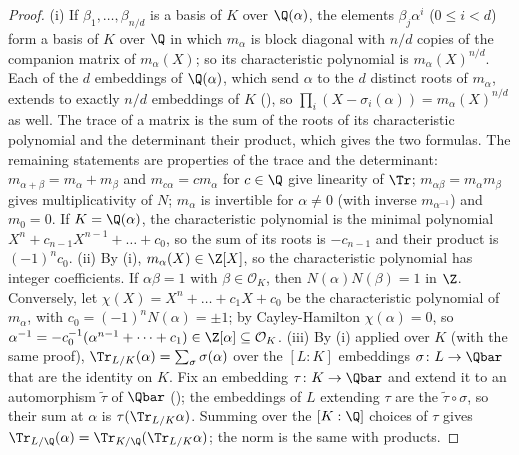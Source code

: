 \begin{proof}
(i) If $\beta_1,\dots,\beta_{n/d}$ is a basis of $K$ over $\Q(\alpha)$, the elements $\beta_j\alpha^i$ ($0\le i<d$) form a basis of $K$ over $\Q$ in which
$m_\alpha$ is block diagonal with $n/d$ copies of the companion matrix of $m_\alpha(X)$; so its characteristic polynomial is $m_\alpha(X)^{n/d}$.
Each of the $d$ embeddings of $\Q(\alpha)$, which send $\alpha$ to the $d$ distinct roots of $m_\alpha$, extends to exactly $n/d$ embeddings of
$K$ (), so $\prod_i(X-\sigma_i(\alpha))=m_\alpha(X)^{n/d}$ as well. The trace of a matrix is the sum of the roots of its
characteristic polynomial and the determinant their product, which gives the two formulas. The remaining statements are properties of the trace and
the determinant: $m_{\alpha+\beta}=m_\alpha+m_\beta$ and $m_{c\alpha}=cm_\alpha$ for $c\in\Q$ give linearity of $\Tr$; $m_{\alpha\beta}=m_\alpha m_\beta$ gives
multiplicativity of $N$; $m_\alpha$ is invertible for $\alpha\ne0$ (with inverse $m_{\alpha^{-1}}$) and $m_0=0$. If $K=\Q(\alpha)$, the characteristic polynomial is the
minimal polynomial $X^n+c_{n-1}X^{n-1}+\dots+c_0$, so the sum of its roots is $-c_{n-1}$ and their product is $(-1)^nc_0$.
(ii) By (i), $m_\alpha(X)\in\Z[X]$, so the characteristic polynomial has integer coefficients. If $\alpha\beta=1$ with
$\beta\in\mathcal O_K$, then $N(\alpha)N(\beta)=1$ in $\Z$. Conversely, let $\chi(X)=X^n+\dots+c_1X+c_0$ be the characteristic polynomial of
$m_\alpha$, with $c_0=(-1)^nN(\alpha)=\pm1$; by Cayley-Hamilton $\chi(\alpha)=0$, so $\alpha^{-1}=-c_0^{-1}(\alpha^{n-1}+\dots+c_1)\in\Z[\alpha]\subseteq\mathcal O_K$.
(iii) By (i) applied over $K$ (with the same proof), $\Tr_{L/K}(\alpha)=\sum_\sigma\sigma(\alpha)$ over the $[L:K]$ embeddings $\sigma\colon L\to\Qbar$
that are the identity on $K$. Fix an embedding $\tau\colon K\to\Qbar$ and extend it to an automorphism $\tilde\tau$ of $\Qbar$ (); the
embeddings of $L$ extending $\tau$ are the $\tilde\tau\circ\sigma$, so their sum at $\alpha$ is $\tau(\Tr_{L/K}\alpha)$. Summing over the $[K:\Q]$
choices of $\tau$ gives $\Tr_{L/\Q}(\alpha)=\Tr_{K/\Q}(\Tr_{L/K}\alpha)$; the norm is the same with products.
\end{proof}

